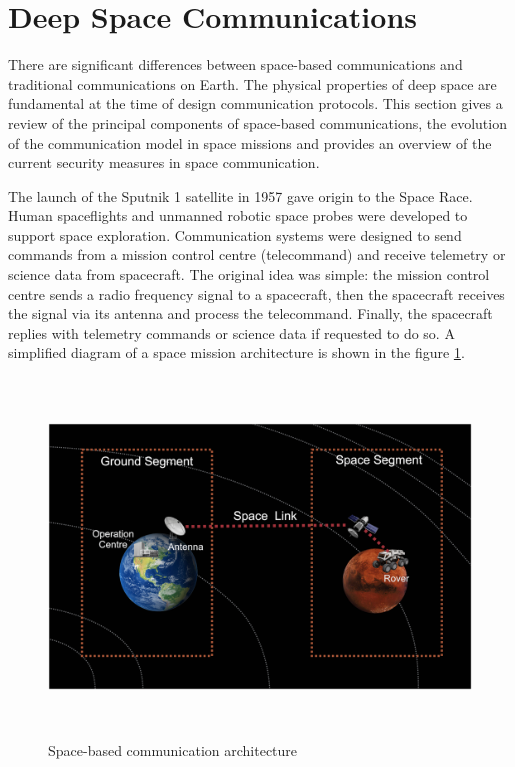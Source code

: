 \section{Deep Space Communications}
\label{sec:space}

There are significant differences between space-based communications and traditional communications on Earth. The physical properties of deep space are fundamental at the time of design communication protocols. This section gives a review of the principal components of space-based communications, the evolution of the communication model in space missions and provides an overview of the current security measures in space communication. 


The launch of the Sputnik 1 satellite in 1957 gave origin to the Space Race. Human spaceflights and unmanned robotic space probes were developed to support space exploration. Communication systems were designed to send commands from a mission control centre (telecommand) and receive telemetry or science data from spacecraft. The original idea was simple: the mission control centre sends a radio frequency signal to a spacecraft, then the spacecraft receives the signal via its antenna and process the telecommand. Finally, the spacecraft replies with telemetry commands or science data if requested to do so. A simplified diagram of a space mission architecture is shown in the figure \ref{fig:space-based-arc}.  



\begin{figure}[ht]
\centering
\includegraphics[width=1 \linewidth, height=9.5cm]{images/ground.png} 
\caption{Space-based communication architecture}
\label{fig:space-based-arc}
\end{figure}

